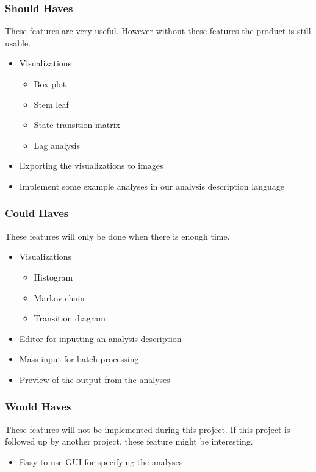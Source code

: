 \subsubsection{Should Haves}
These features are very useful. However without these features the product is still usable.
\begin{itemize}
	\item Visualizations
    \begin{itemize}
    	\item Box plot
        \item Stem leaf
        \item State transition matrix
        \item Lag analysis
    \end{itemize}
	\item Exporting the visualizations to images
    \item Implement some example analyses in our analysis description language
\end{itemize}

\subsubsection{Could Haves}
These features will only be done when there is enough time.
 \begin{itemize}
  \item Visualizations
  \begin{itemize}
	  \item Histogram
      \item Markov chain
      \item Transition diagram
  \end{itemize}
  \item Editor for inputting an analysis description 
  \item Mass input for batch processing 
  \item Preview of the output from the analyses
\end{itemize}

\subsubsection{Would Haves}
These features will not be implemented during this project. If this project is followed up by another project, these feature might be interesting.
\begin{itemize}
	\item Easy to use GUI for specifying the analyses 
\end{itemize}
